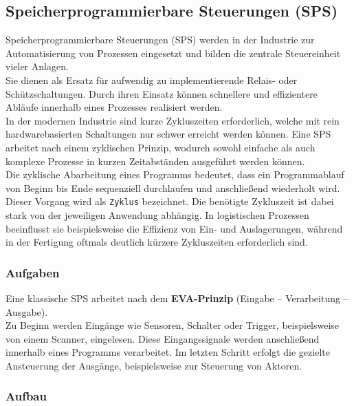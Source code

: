 \subsection{Speicherprogrammierbare Steuerungen (SPS)}

Speicherprogrammierbare Steuerungen (SPS) werden in der Industrie zur Automatisierung von Prozessen eingesetzt und bilden die zentrale Steuereinheit vieler Anlagen.\\
Sie dienen als Ersatz für aufwendig zu implementierende Relais- oder Schützschaltungen. Durch ihren Einsatz können schnellere und effizientere Abläufe innerhalb eines Prozesses realisiert werden.\\

In der modernen Industrie sind kurze Zykluszeiten erforderlich, welche mit rein hardwarebasierten Schaltungen nur schwer erreicht werden können. Eine SPS arbeitet nach einem zyklischen Prinzip, wodurch sowohl einfache als auch komplexe Prozesse in kurzen Zeitabständen ausgeführt werden können.\\

Die zyklische Abarbeitung eines Programms bedeutet, dass ein Programmablauf von Beginn bis Ende sequenziell durchlaufen und anschließend wiederholt wird. Dieser Vorgang wird als \texttt{Zyklus} bezeichnet. Die benötigte Zykluszeit ist dabei stark von der jeweiligen Anwendung abhängig. In logistischen Prozessen beeinflusst sie beispielsweise die Effizienz von Ein- und Auslagerungen, während in der Fertigung oftmals deutlich kürzere Zykluszeiten erforderlich sind\cite{Seitz.2021}.

\subsubsection{Aufgaben}

Eine klassische SPS arbeitet nach dem \textbf{EVA-Prinzip} (Eingabe – Verarbeitung – Ausgabe)\cite{EVA-Prinzip}.\\

Zu Beginn werden Eingänge wie Sensoren, Schalter oder Trigger, beispielsweise von einem Scanner, eingelesen. Diese Eingangssignale werden anschließend innerhalb eines Programms verarbeitet. Im letzten Schritt erfolgt die gezielte Ansteuerung der Ausgänge, beispielsweise zur Steuerung von Aktoren.

\subsubsection{Aufbau}

